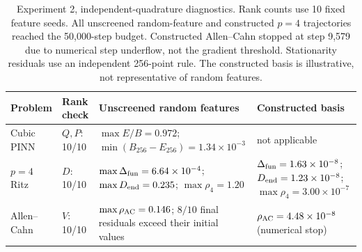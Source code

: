 \begin{table}[t]
\centering
\small
\setlength{\tabcolsep}{4pt}
\renewcommand{\arraystretch}{1.15}
\begin{tabular}{@{}p{}p{}p{}p{}@{}}
\hline
Problem & Rank check & Unscreened random features & Constructed basis \\
\hline
Cubic PINN & $Q,P$: 10/10 & $\max E/B=0.972$; $\min(B_{256}-E_{256})=1.34\times10^{-3}$ & not applicable \\
$p=4$ Ritz & $D$: 10/10 & $\max\Delta_{\rm fun}=6.64\times10^{-4}$; $\max D_{\rm end}=0.235$; $\max\rho_4=1.20$ & $\Delta_{\rm fun}=1.63\times10^{-8}$; $D_{\rm end}=1.23\times10^{-8}$; $\max\rho_4=3.00\times10^{-7}$ \\
Allen--Cahn & $V$: 10/10 & $\max\rho_{\rm AC}=0.146$; $8/10$ final residuals exceed their initial values & $\rho_{\rm AC}=4.48\times10^{-8}$ (numerical stop) \\
\hline
\end{tabular}
\caption{Experiment 2, independent-quadrature diagnostics. Rank counts use 10 fixed feature seeds. All unscreened random-feature and constructed $p=4$ trajectories reached the 50,000-step budget. Constructed Allen--Cahn stopped at step 9,579 due to numerical step underflow, not the gradient threshold. Stationarity residuals use an independent 256-point rule. The constructed basis is illustrative, not representative of random features.}
\label{tab:experiment2}
\end{table}
